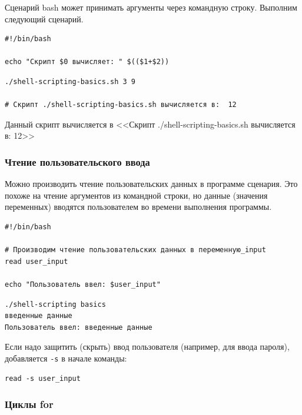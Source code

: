 \documentclass[12pt]{article}
\begin{document}
Сценарий bash может принимать аргументы через командную строку. Выполним
следующий сценарий.
\begin{verbatim}
#!/bin/bash

echo "Скрипт $0 вычисляет: " $(($1+$2))
\end{verbatim}

\begin{verbatim}
./shell-scripting-basics.sh 3 9

# Скрипт ./shell-scripting-basics.sh вычисляется в:  12
\end{verbatim}
Данный скрипт вычисляется в <<Скрипт ./shell-scripting-basics.sh
вычисляется в: 12>>


\hypertarget{Reading-user-input}{%
\subsubsection{\texorpdfstring{\protect\hyperlink{Reading-user-input}{}Чтение
пользовательского
ввода}{Чтение пользовательского ввода}}\label{Reading-user-input}}

Можно производить чтение пользовательских данных в программе сценария.
Это похоже на чтение аргументов из командной строки, но данные (значения
переменных) вводятся пользователем во времени выполнения программы.
\begin{verbatim}
#!/bin/bash

# Производим чтение пользовательских данных в переменную_input
read user_input

echo "Пользователь ввел: $user_input"
\end{verbatim}

\begin{verbatim}
./shell-scripting basics
введенные данные
Пользователь ввел: введенные данные
\end{verbatim}

Если надо защитить (скрыть) ввод пользователя (например, для ввода
пароля), добавляется \texttt{-s} в начале команды:

\begin{verbatim}
read -s user_input
\end{verbatim}

\hypertarget{for-loops}{%
\subsubsection{\texorpdfstring{\protect\hyperlink{for-loops}{}Циклы
for}{Циклы for}}\label{for-loops}}
\end{document}
